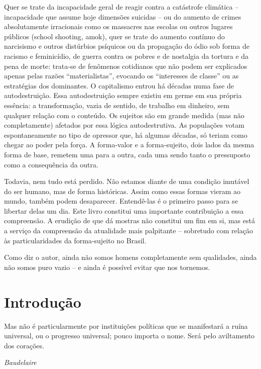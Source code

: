 Quer se trate da incapacidade geral de reagir contra a catástrofe
climática -- incapacidade que assume hoje dimensões suicidas -- ou do
aumento de crimes absolutamente irracionais como os massacres nas
escolas ou outros lugares públicos (school shooting, amok), quer se
trate do aumento contínuo do narcisismo e outros distúrbios psíquicos ou
da propagação do ódio sob forma de racismo e feminicídio, de guerra
contra os pobres e de nostalgia da tortura e da pena de morte: trata-se
de fenômenos cotidianos que não podem ser explicados apenas pelas razões
``materialistas'', evocando os ``interesses de classe'' ou as
estratégias dos dominantes. O capitalismo entrou há décadas numa fase de
autodestruição. Essa autodestruição sempre existiu em germe em sua
própria essência: a transformação, vazia de sentido, de trabalho em
dinheiro, sem qualquer relação com o conteúdo. Os sujeitos são em grande
medida (mas não completamente) afetados por essa lógica autodestrutiva.
As populações votam espontaneamente no tipo de opressor que, há algumas
décadas, só teriam como chegar ao poder pela força. A forma-valor e a
forma-sujeito, dois lados da mesma forma de base, remetem uma para a
outra, cada uma sendo tanto o pressuposto como a consequência da outra.

Todavia, nem tudo está perdido. Não estamos diante de uma condição
imutável do ser humano, mas de forma históricas. Assim como essas formas
vieram ao mundo, também podem desaparecer. Entendê-las é o primeiro
passo para se libertar delas um dia. Este livro constitui uma importante
contribuição a essa compreensão. A erudição de que dá mostras não
constitui um fim em si, mas está a serviço da compreensão da atualidade
mais palpitante -- sobretudo com relação às particularidades da
forma-sujeito no Brasil.

Como diz o autor, ainda não somos homens completamente sem qualidades,
ainda não somos puro vazio -- e ainda é possível evitar que nos
tornemos.

\chapter{Introdução}

\begin{flushright}
Mas não é particularmente por instituições políticas que se manifestará
a ruína universal, ou o progresso universal; pouco importa o nome. Será
pelo aviltamento dos corações.

\emph{Baudelaire}
\end{flushright}

